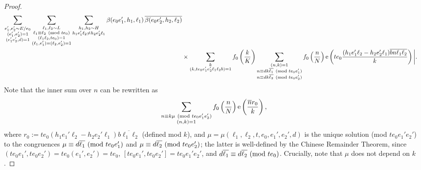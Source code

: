 \documentclass[reqno,11pt]{amsart}
\theoremstyle{definition}
\theoremstyle{remark}
\numberwithin{equation}{section}
\newcommand{\e}{\textnormal{e}}
\renewcommand{\bar}{\overline}
\renewcommand{\pmod}[1]{\ (\textnormal{mod } #1)}
\begin{document}
\begin{proof}
\[\begin{aligned}
    \sum_{\substack{e_1', e_2' \sim E/e_0 \\ (e_1', e_2') = 1 \\ (e_1' e_2', d) = 1}}
    \sum_{\substack{\ell_1, \ell_2 \sim L \\ \ell_1 \equiv \ell_2 \pmod{te_0} \\ (\ell_1 \ell_2, te_0) = 1 \\ (\ell_1, e_1') = (\ell_2, e_2') = 1}}
    \sum_{\substack{h_1, h_2 \sim H \\ h_1e_1'\ell_2 \neq h_2e_2'\ell_1}} \beta(e_0e_1', h_1, \ell_1) \, \bar{\beta(e_0e_2', h_2, \ell_2)} 
    \\
    &\times 
    \sum_{\substack{k \\ (k, te_0e_1'e_2'\ell_1\ell_2b) = 1}} 
    f_0\left(\frac{k}{K}\right)
    \sum_{\substack{(n, k) = 1 \\ n \equiv dk\bar{\ell_1} \pmod{te_0e_1'} \\ n \equiv dk\bar{\ell_2} \pmod{te_0e_2'}}}
    f_0\left(\frac{n}{N}\right)
    \e \left(te_0\frac{(h_1e_1'\ell_2 - h_2e_2'\ell_1)\bar{bn \ell_1 \ell_2}}{k} \right)\bigg\vert.
\end{aligned}
\]
Note that the inner sum over $n$ can be rewritten as
\[
    \sum_{\substack{n \equiv k\mu \pmod{te_0e_1'e_2'} \\ (n, k) = 1}}
    f_0\left(\frac{n}{N}\right)
    \e \left(\frac{\bar{n}r_0}{k} \right),
\]
where $r_0 := te_0 (h_1e_1'\ell_2 - h_2e_2'\ell_1)\bar{b \ell_1 \ell_2}$ (defined mod $k$), and $\mu = \mu(\ell_1, \ell_2, t, e_0, e_1', e_2', d)$ is the unique solution (mod $te_0e_1'e_2'$) to the congruences $\mu \equiv d\bar{\ell_1} \pmod{te_0e_1'}$ and $\mu \equiv d\bar{\ell_2} \pmod{te_0e_2'}$; the latter is well-defined by the Chinese Remainder Theorem, since $(te_0e_1', te_0e_2') = te_0(e_1', e_2') = te_0$, $[te_0e_1', te_0e_2'] = te_0e_1'e_2'$, and $d\bar{\ell_1} \equiv d\bar{\ell_2} \pmod{te_0}$. Crucially, note that $\mu$ does not depend on $k$.


\end{proof}
\end{document}
